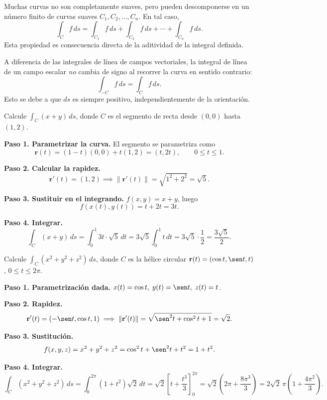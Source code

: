 \begin{rem}
Muchas curvas no son completamente suaves, pero pueden descomponerse en
un número finito de curvas suaves \(C_1, C_2, \dots, C_n\). En tal caso,
\[
\int_C f\,ds = \int_{C_1} f\,ds + \int_{C_2} f\,ds + \cdots + \int_{C_n} f\,ds.
\]
Esta propiedad es consecuencia directa de la aditividad de la integral
definida.
\end{rem}

\begin{rem}
A diferencia de las integrales de línea de campos vectoriales, la
integral de línea de un campo escalar \emph{no} cambia de signo al
recorrer la curva en sentido contrario:
\[
\int_{-C} f\,ds = \int_C f\,ds.
\]
Esto se debe a que \(ds\) es siempre positivo, independientemente de
la orientación.
\end{rem}

\begin{example}
Calcule \(\displaystyle \int_C (x + y)\,ds\), donde \(C\) es el
segmento de recta desde \((0,0)\) hasta \((1,2)\).
\begin{myproof}
\textbf{Paso 1. Parametrizar la curva.}
El segmento se parametriza como
\[
\mathbf{r}(t) = (1-t)(0,0) + t(1,2) = (t, 2t), \qquad 0 \le t \le 1.
\]

\textbf{Paso 2. Calcular la rapidez.}
\[
\mathbf{r}'(t) = (1, 2) \implies
\|\mathbf{r}'(t)\| = \sqrt{1^2 + 2^2} = \sqrt{5}.
\]

\textbf{Paso 3. Sustituir en el integrando.}
\(f(x,y) = x + y\), luego
\[
f(x(t), y(t)) = t + 2t = 3t.
\]

\textbf{Paso 4. Integrar.}
\[
\int_C (x+y)\,ds =
\int_0^1 3t \cdot \sqrt{5}\,dt =
3\sqrt{5} \int_0^1 t\,dt =
3\sqrt{5} \cdot \frac{1}{2}
= \boxed{\frac{3\sqrt{5}}{2}}.
\]
\end{myproof}
\end{example}

\begin{example}
Calcule \(\displaystyle \int_C (x^2 + y^2 + z^2)\,ds\), donde \(C\) es
la hélice circular \(\mathbf{r}(t) = (\cos t, \sen t, t)\),
\(0 \le t \le 2\pi\).
\begin{myproof}
\textbf{Paso 1. Parametrización dada.}
\(x(t) = \cos t,\; y(t) = \sen t,\; z(t) = t\).

\textbf{Paso 2. Rapidez.}
\[
\mathbf{r}'(t) = (-\sen t, \cos t, 1) \implies
\|\mathbf{r}'(t)\| = \sqrt{\sen^2 t + \cos^2 t + 1} = \sqrt{2}.
\]

\textbf{Paso 3. Sustitución.}
\[
f(x,y,z) = x^2 + y^2 + z^2 = \cos^2 t + \sen^2 t + t^2 = 1 + t^2.
\]

\textbf{Paso 4. Integrar.}
\[
\int_C (x^2 + y^2 + z^2)\,ds =
\int_0^{2\pi} (1 + t^2)\sqrt{2}\,dt =
\sqrt{2} \left[ t + \frac{t^3}{3} \right]_0^{2\pi}
= \sqrt{2} \left( 2\pi + \frac{8\pi^3}{3} \right)
= \boxed{2\sqrt{2}\,\pi \left(1 + \frac{4\pi^2}{3}\right)}.
\]
\end{myproof}
\end{example}

